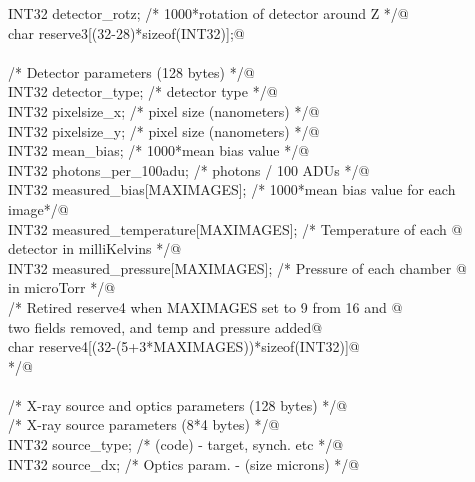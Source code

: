 \documentclass[10pt,a4paper,twoside,notitlepage]{article}
\begin{document}
\begin{flushleft}
\begin{minipage}{\linewidth}
\begin{list}{}{}
\mbox{}\verb@         INT32 detector_rotz;          /* 1000*rotation of detector  around Z */@\\
\mbox{}\verb@         char reserve3[(32-28)*sizeof(INT32)];@\\
\mbox{}\verb@@\\
\mbox{}\verb@         /* Detector parameters (128 bytes) */@\\
\mbox{}\verb@         INT32 detector_type;            /* detector type */@\\
\mbox{}\verb@         INT32 pixelsize_x;              /* pixel size (nanometers) */@\\
\mbox{}\verb@         INT32 pixelsize_y;              /* pixel size (nanometers) */@\\
\mbox{}\verb@         INT32 mean_bias;                        /* 1000*mean bias value */@\\
\mbox{}\verb@         INT32 photons_per_100adu;       /* photons / 100 ADUs */@\\
\mbox{}\verb@         INT32 measured_bias[MAXIMAGES]; /* 1000*mean bias value for each image*/@\\
\mbox{}\verb@         INT32 measured_temperature[MAXIMAGES];  /* Temperature of each  @\\
\mbox{}\verb@                                                    detector in milliKelvins */@\\
\mbox{}\verb@         INT32 measured_pressure[MAXIMAGES]; /* Pressure of each  chamber @\\
\mbox{}\verb@                                               in microTorr */@\\
\mbox{}\verb@         /* Retired reserve4 when MAXIMAGES set to 9 from 16 and @\\
\mbox{}\verb@            two fields removed, and temp and pressure added@\\
\mbox{}\verb@          char reserve4[(32-(5+3*MAXIMAGES))*sizeof(INT32)]@\\
\mbox{}\verb@         */@\\
\mbox{}\verb@@\\
\mbox{}\verb@         /* X-ray source and optics parameters (128 bytes) */@\\
\mbox{}\verb@         /* X-ray source parameters (8*4 bytes) */@\\
\mbox{}\verb@         INT32 source_type;              /* (code) - target, synch. etc */@\\
\mbox{}\verb@         INT32 source_dx;                /* Optics param. - (size  microns) */@\\

\end{list}
\end{minipage}
\end{flushleft}
\end{document}
